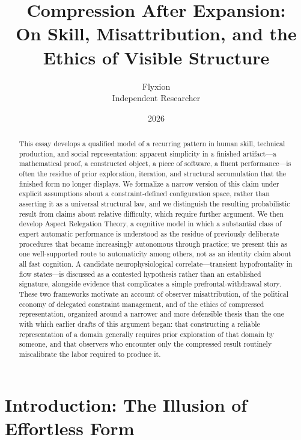\documentclass[12pt, a4paper]{article}
\title{\Large\textbf{Compression After Expansion:\\
On Skill, Misattribution, and the Ethics of Visible Structure}}
\author{Flyxion\\
\small Independent Researcher}
\date{2026}
\theoremstyle{plain}
\theoremstyle{definition}
\theoremstyle{remark}
\begin{document}
\maketitle

\begin{abstract}
This essay develops a qualified model of a recurring pattern in human skill, technical production, and social representation: apparent simplicity in a finished artifact---a mathematical proof, a constructed object, a piece of software, a fluent performance---is often the residue of prior exploration, iteration, and structural accumulation that the finished form no longer displays. We formalize a narrow version of this claim under explicit assumptions about a constraint-defined configuration space, rather than asserting it as a universal structural law, and we distinguish the resulting probabilistic result from claims about relative difficulty, which require further argument. We then develop Aspect Relegation Theory, a cognitive model in which a substantial class of expert automatic performance is understood as the residue of previously deliberate procedures that became increasingly autonomous through practice; we present this as one well-supported route to automaticity among others, not as an identity claim about all fast cognition. A candidate neurophysiological correlate---transient hypofrontality in flow states---is discussed as a contested hypothesis rather than an established signature, alongside evidence that complicates a simple prefrontal-withdrawal story. These two frameworks motivate an account of observer misattribution, of the political economy of delegated constraint management, and of the ethics of compressed representation, organized around a narrower and more defensible thesis than the one with which earlier drafts of this argument began: that constructing a reliable representation of a domain generally requires prior exploration of that domain by someone, and that observers who encounter only the compressed result routinely miscalibrate the labor required to produce it.
\end{abstract}

\tableofcontents

\newpage

\section{Introduction: The Illusion of Effortless Form}
\label{sec:intro}
\end{document}
